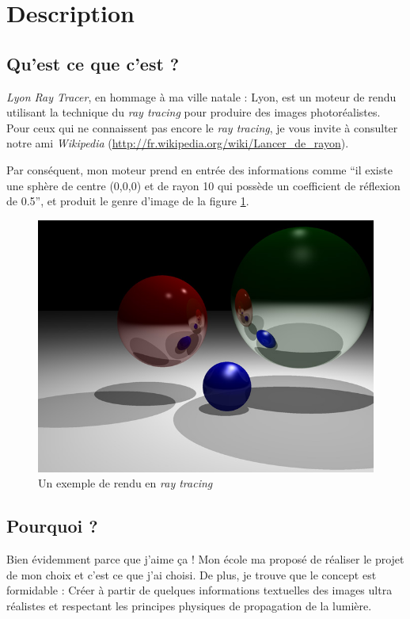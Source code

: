\section{Description}
\subsection{Qu'est ce que c'est ?}
\textsl{Lyon Ray Tracer}, en hommage à ma ville natale : Lyon, est un moteur
de rendu utilisant la technique du \textsl{ray tracing} pour produire des
images photoréalistes. Pour ceux qui ne connaissent pas encore le \textsl{ray
tracing}, je vous invite à consulter notre ami \textsl{Wikipedia}
(\url{http://fr.wikipedia.org/wiki/Lancer_de_rayon}).

Par conséquent, mon moteur prend en entrée des informations comme ``il existe
une sphère de centre (0,0,0) et de rayon 10 qui possède un coefficient de
réflexion de 0.5'', et produit le genre d'image de la figure
\ref{fig:spheres}.

\begin{figure}
\begin{center}
  \includegraphics[width=.8\textwidth]{img/spheres}
  \caption{Un exemple de rendu en \textsl{ray tracing}\label{fig:spheres}}
\end{center}
\end{figure}

\subsection{Pourquoi ?}
Bien évidemment parce que j'aime ça ! Mon école ma proposé de réaliser le
projet de mon choix et c'est ce que j'ai choisi. De plus, je trouve que le
concept est formidable : Créer à partir de quelques informations textuelles
des images ultra réalistes et respectant les principes physiques de propagation
de la lumière.

